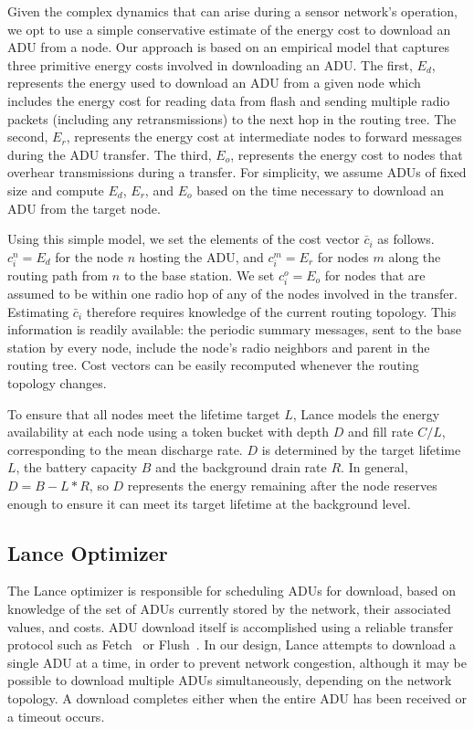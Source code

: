 Given the complex dynamics that can arise during a sensor network's
operation, we opt to use a simple conservative estimate of the energy cost to
download an ADU from a node. Our approach is based on an empirical model that
captures three primitive energy costs involved in downloading an ADU. The
first, $E_d$, represents the energy used to download an ADU from a given node
which includes the energy cost for reading data from flash and sending
multiple radio packets (including any retransmissions) to the next hop in the
routing tree. The second, $E_r$, represents the energy cost at intermediate
nodes to forward messages during the ADU transfer. The third, $E_o$,
represents the energy cost to nodes that overhear transmissions during a
transfer. For simplicity, we assume ADUs of fixed size and compute $E_d$,
$E_r$, and $E_o$ based on the time necessary to download an ADU from the
target node.

Using this simple model, we set the elements of the cost vector $\bar{c}_i$
as follows. $c_i^n = E_d$ for the node $n$ hosting the ADU, and $c_i^m = E_r$
for nodes $m$ along the routing path from $n$ to the base station. We set
$c_i^o = E_o$ for nodes that are assumed to be within one radio hop of any of
the nodes involved in the transfer. Estimating $\bar{c}_i$ therefore requires
knowledge of the current routing topology. This information is readily
available: the periodic summary messages, sent to the base station by every
node, include the node's radio neighbors and parent in the routing tree. Cost
vectors can be easily recomputed whenever the routing topology changes.

To ensure that all nodes meet the lifetime target $L$, Lance models the
energy availability at each node using a token bucket with depth $D$ and fill
rate $C/L$, corresponding to the mean discharge rate. $D$ is determined by
the target lifetime $L$, the battery capacity $B$ and the background drain
rate $R$. In general, $D = B - L*R$, so $D$ represents the energy remaining
after the node reserves enough to ensure it can meet its target lifetime at
the background level.

\subsection{Lance Optimizer}
\label{lance-subsec-optimizer}

The Lance optimizer is responsible for scheduling ADUs for download, based on
knowledge of the set of ADUs currently stored by the network, their
associated values, and costs. ADU download itself is accomplished using a
reliable transfer protocol such as Fetch~\cite{volcano-osdi06} or
Flush~\cite{flush-sensys07}. In our design, Lance attempts to download a
single ADU at a time, in order to prevent network congestion, although it may
be possible to download multiple ADUs simultaneously, depending on the
network topology. A download completes either when the entire ADU has been
received or a timeout occurs.

